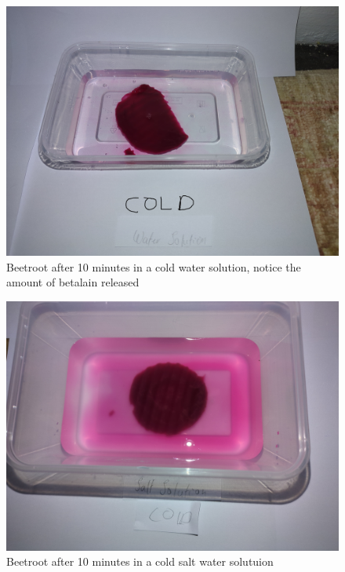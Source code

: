 \documentclass[a4paper,12pt,twoside,english]{all-in-one} %
\begin{document}
\begin{figure}
    \centering
    \includegraphics[scale=0.1]{images/P_1.jpg}
    \caption{Beetroot after 10 minutes in a cold water solution, notice the amount of betalain released}
    \label{fig:enter-label}
\end{figure}

\begin{figure}
    \centering
    \includegraphics[scale=0.1]{images/P_4.jpg}
    \caption{Beetroot after 10 minutes in a cold salt water solutuion}
    \label{fig:enter-label}
\end{figure}
\end{document}
